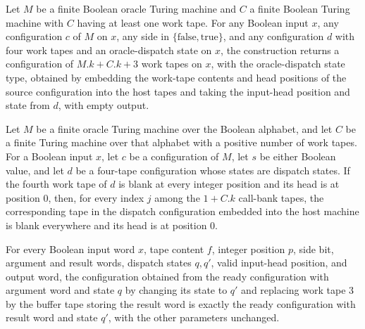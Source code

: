 \begin{definition}
\label{Turing.oracleDispatchCfg}
\leanok
{}
Let $M$ be a finite Boolean oracle Turing machine and $C$ a finite Boolean Turing
machine with $C$ having at least one work tape. For any Boolean input $x$, any
configuration $c$ of $M$ on $x$, any side in $\{\mathrm{false},\mathrm{true}\}$, and
any configuration $d$ with four work tapes and an oracle-dispatch state on $x$, the
construction returns a configuration of $M.k+ C.k+3$ work tapes on $x$, with the
oracle-dispatch state type, obtained by embedding the work-tape contents and head
positions of the source configuration into the host tapes and taking the input-head
position and state from $d$, with empty output.
\end{definition}

\begin{theorem}
\label{Turing.oracleDispatchCfg_callBlank}
\leanok
{}
Let $M$ be a finite oracle Turing machine over the Boolean alphabet, and let $C$ be a
finite Turing machine over that alphabet with a positive number of work tapes. For a
Boolean input $x$, let $c$ be a configuration of $M$, let $s$ be either Boolean value,
and let $d$ be a four-tape configuration whose states are dispatch states. If the fourth
work tape of $d$ is blank at every integer position and its head is at position $0$,
then, for every index $j$ among the $1+C.k$ call-bank tapes, the corresponding tape in
the dispatch configuration embedded into the host machine is blank everywhere and its
head is at position $0$.
\end{theorem}

\begin{theorem}
\label{Turing.oracleReadyCfg_replace}
\leanok
{}
For every Boolean input word $x$, tape content $f$, integer position $p$, side bit,
argument and result words, dispatch states $q,q'$, valid input-head position, and output
word, the configuration obtained from the ready configuration with argument word and
state $q$ by changing its state to $q'$ and replacing work tape $3$ by the buffer tape
storing the result word is exactly the ready configuration with result word and state
$q'$, with the other parameters unchanged.
\end{theorem}

